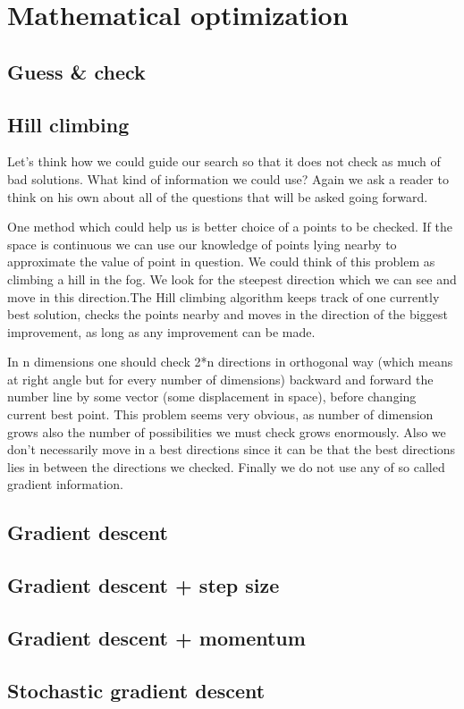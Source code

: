\chapter{Mathematical optimization}
\label{chap:optimization}


\section{Guess \& check}


\section{Hill climbing}

Let’s think how we could guide our search so that it does not check as
much of bad solutions. What kind of information we could use? Again we
ask a reader to think on his own about all of the questions that will be
asked going forward.

One method which could help us is better choice of a points to be checked.
If the space is continuous we can use our knowledge of points lying nearby
to approximate the value of point in question. We could think of this
problem as climbing a hill in the fog. We look for the steepest direction
which we can see and move in this direction.The Hill climbing algorithm keeps track of one currently best solution,
checks the points nearby and moves in the direction of the biggest
improvement, as long as any improvement can be made.

In n dimensions one should check 2*n directions in orthogonal way
(which means at right angle but for every number of dimensions)
backward and forward the number line by some vector (some displacement
in space), before changing current best point. This problem seems very
obvious, as number of dimension grows also the number of possibilities
we must check grows enormously. Also we don’t necessarily move in a
best directions since it can be that the best directions lies in between the
directions we checked. Finally we do not use any of so called gradient
information.


\section{Gradient descent}


\section{ Gradient descent + step size}



\section{ Gradient descent + momentum}


\section{Stochastic gradient descent}